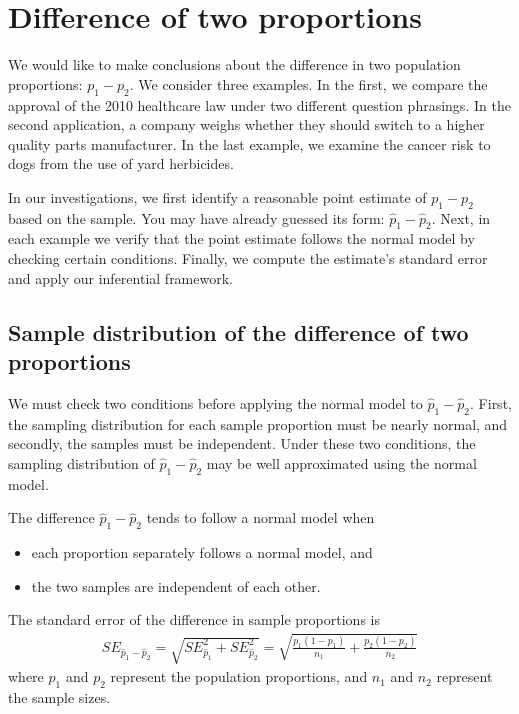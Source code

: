 \section{Difference of two proportions}
\label{differenceOfTwoProportions}

We would like to make conclusions about the difference in two population proportions: $p_1 - p_2$. We consider three examples. In the first, we compare the approval of the 2010 healthcare law under two different question phrasings. In the second application, a company weighs whether they should switch to a higher quality parts manufacturer. In the last example, we examine the cancer risk to dogs from the use of yard herbicides.

In our investigations, we first identify a reasonable point estimate of $p_1 - p_2$ based on the sample. You may have already guessed its form: $\hat{p}_1 - \hat{p}_2$. Next, in each example we verify that the point estimate follows the normal model by checking certain conditions. Finally, we compute the estimate's standard error and apply our inferential framework.


\subsection{Sample distribution of the difference of two proportions}

We must check two conditions before applying the normal model to $\hat{p}_1 - \hat{p}_2$. First, the sampling distribution for each sample proportion must be nearly normal, and secondly, the samples must be independent. Under these two conditions, the sampling distribution of $\hat{p}_1 - \hat{p}_2$ may be well approximated using the normal model.

\begin{termBox}{
The difference $\hat{p}_1 - \hat{p}_2$ tends to follow a normal model when
\begin{itemize}
\setlength{\itemsep}{0mm}
\item each proportion separately follows a normal model, and
\item the two samples are independent of each other.
\end{itemize}
The standard error of the difference in sample proportions is
\begin{eqnarray}
SE_{\hat{p}_1 - \hat{p}_2}
	= \sqrt{SE_{\hat{p}_1}^2 + SE_{\hat{p}_2}^2}
	= \sqrt{\frac{p_1(1-p_1)}{n_1} + \frac{p_2(1-p_2)}{n_2}}
\label{seForDiffOfProp}
\end{eqnarray}
where $p_1$ and $p_2$ represent the population proportions, and $n_1$ and $n_2$ represent the sample sizes.}
\end{termBox}

